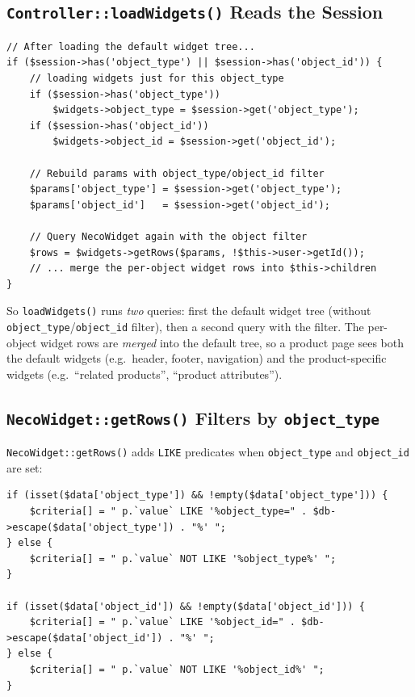 \documentclass[11pt,a4paper]{article}
\begin{document}
\subsection{\texttt{Controller::loadWidgets()} Reads the Session}

\begin{lstlisting}[caption={\texttt{Controller::loadWidgets()} reads session \texttt{object\_type} for per-object widget overrides.},label={lst:loadwidgets-session}]
// After loading the default widget tree...
if ($session->has('object_type') || $session->has('object_id')) {
    // loading widgets just for this object_type
    if ($session->has('object_type'))
        $widgets->object_type = $session->get('object_type');
    if ($session->has('object_id'))
        $widgets->object_id = $session->get('object_id');

    // Rebuild params with object_type/object_id filter
    $params['object_type'] = $session->get('object_type');
    $params['object_id']   = $session->get('object_id');

    // Query NecoWidget again with the object filter
    $rows = $widgets->getRows($params, !$this->user->getId());
    // ... merge the per-object widget rows into $this->children
}
\end{lstlisting}

So \texttt{loadWidgets()} runs \emph{two} queries: first the default
widget tree (without \texttt{object\_type}/\texttt{object\_id} filter),
then a second query with the filter. The per-object widget rows are
\emph{merged} into the default tree, so a product page sees both the
default widgets (e.g.\ header, footer, navigation) and the
product-specific widgets (e.g.\ ``related products'',
``product attributes'').

\subsection{\texttt{NecoWidget::getRows()} Filters by \texttt{object\_type}}

\texttt{NecoWidget::getRows()} adds \texttt{LIKE} predicates when
\texttt{object\_type} and \texttt{object\_id} are set:

\begin{lstlisting}[caption={\texttt{NecoWidget::getRows()} adds \texttt{object\_type}/\texttt{object\_id} filters.},label={lst:necowidget-object}]
if (isset($data['object_type']) && !empty($data['object_type'])) {
    $criteria[] = " p.`value` LIKE '%object_type=" . $db->escape($data['object_type']) . "%' ";
} else {
    $criteria[] = " p.`value` NOT LIKE '%object_type%' ";
}

if (isset($data['object_id']) && !empty($data['object_id'])) {
    $criteria[] = " p.`value` LIKE '%object_id=" . $db->escape($data['object_id']) . "%' ";
} else {
    $criteria[] = " p.`value` NOT LIKE '%object_id%' ";
}
\end{lstlisting}
\end{document}
